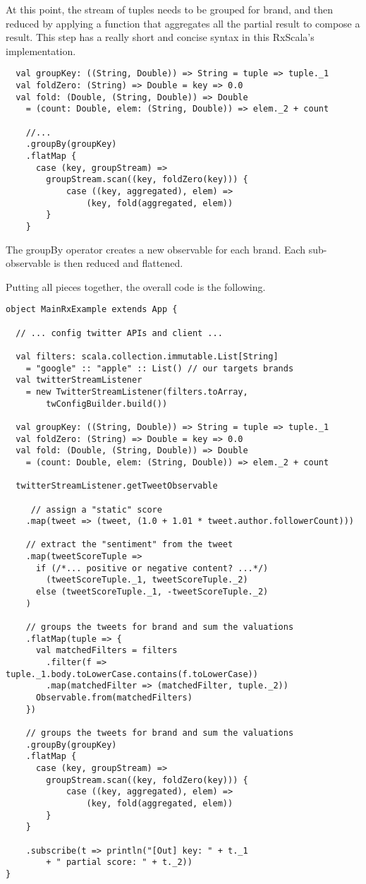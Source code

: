 At this point, the stream of tuples needs to be grouped for brand, and then
reduced by applying a function that aggregates all the partial result to
compose a result. This step has a really short and concise syntax in
this RxScala's implementation.

\begin{verbatim}
  val groupKey: ((String, Double)) => String = tuple => tuple._1
  val foldZero: (String) => Double = key => 0.0
  val fold: (Double, (String, Double)) => Double
    = (count: Double, elem: (String, Double)) => elem._2 + count

    //...
    .groupBy(groupKey)
    .flatMap {
      case (key, groupStream) =>
        groupStream.scan((key, foldZero(key))) {
            case ((key, aggregated), elem) =>
                (key, fold(aggregated, elem))
        }
    }
\end{verbatim}

The groupBy operator creates a new observable for each brand. Each
sub-observable is then reduced and flattened.

Putting all pieces together, the overall code is the following.

\begin{verbatim}
object MainRxExample extends App {

  // ... config twitter APIs and client ...

  val filters: scala.collection.immutable.List[String]
    = "google" :: "apple" :: List() // our targets brands
  val twitterStreamListener
    = new TwitterStreamListener(filters.toArray, 
    	twConfigBuilder.build())

  val groupKey: ((String, Double)) => String = tuple => tuple._1
  val foldZero: (String) => Double = key => 0.0
  val fold: (Double, (String, Double)) => Double
    = (count: Double, elem: (String, Double)) => elem._2 + count

  twitterStreamListener.getTweetObservable

     // assign a "static" score
    .map(tweet => (tweet, (1.0 + 1.01 * tweet.author.followerCount)))

    // extract the "sentiment" from the tweet
    .map(tweetScoreTuple =>
      if (/*... positive or negative content? ...*/)
        (tweetScoreTuple._1, tweetScoreTuple._2)
      else (tweetScoreTuple._1, -tweetScoreTuple._2)
    )

    // groups the tweets for brand and sum the valuations
    .flatMap(tuple => {
      val matchedFilters = filters
        .filter(f => tuple._1.body.toLowerCase.contains(f.toLowerCase))
        .map(matchedFilter => (matchedFilter, tuple._2))
      Observable.from(matchedFilters)
    })

    // groups the tweets for brand and sum the valuations
    .groupBy(groupKey)
    .flatMap {
      case (key, groupStream) =>
        groupStream.scan((key, foldZero(key))) {
            case ((key, aggregated), elem) =>
                (key, fold(aggregated, elem))
        }
    }

    .subscribe(t => println("[Out] key: " + t._1
        + " partial score: " + t._2))
}
\end{verbatim}


